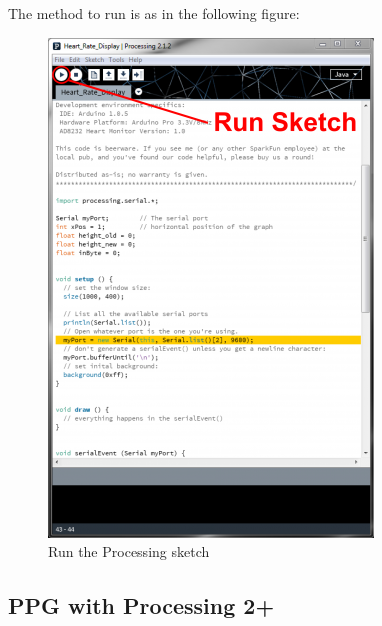 The method to run is as in the following figure: 

\begin{figure}[H]
	\centering
	\includegraphics[width=0.4\linewidth]{ecgprocessing.png}
	\caption{Run the Processing sketch \cite{ad8232}}
\end{figure}

\subsection{PPG with Processing 2+}
\label{georgecode}

